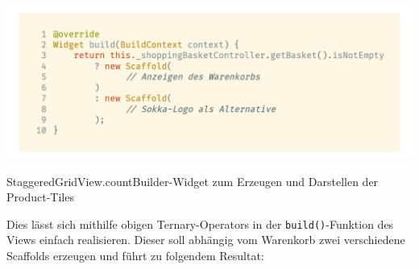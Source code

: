 \begin{code}[H]
    \centering
    \includegraphics[width=1\textwidth]{images/Client/views/basketview/ternary.png}
    \vspace{-20pt}
    \caption{StaggeredGridView.countBuilder-Widget zum Erzeugen und Darstellen der Product-Tiles}
\end{code}

Dies lässt sich mithilfe obigen Ternary-Operators in der \lstinline{build()}-Funktion des Views
einfach realisieren. Dieser soll abhängig vom Warenkorb zwei verschiedene Scaffolds erzeugen und
führt zu folgendem Resultat:

